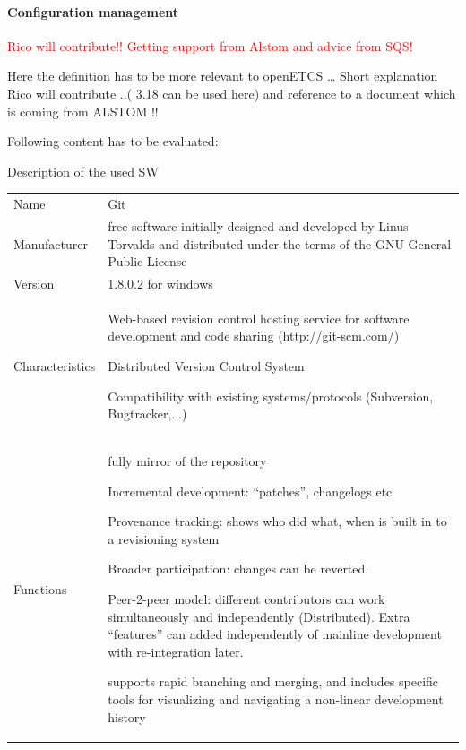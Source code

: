 \documentclass{template/openetcs_article}
\begin{document}
\paragraph{Configuration management}
\textcolor{red}{Rico will contribute!! Getting support from Alstom and advice from SQS!}

Here the definition has to be more relevant to openETCS {\dots}
Short explanation Rico will contribute ..( 3.18 can be used here) and reference to a document which is coming from ALSTOM !!

Following content has to be evaluated:

Description of the used SW 



\begin{flushleft}

\begin{tabular}{|m{3cm}|m{11cm}|}
\hline
\rowcolor{myblue}
\multicolumn{2}{|c|}{CMS Tool} \\\hline
Name &
Git \\\hline
Manufacturer &
free software initially designed and developed by Linus Torvalds and distributed under the terms of the GNU General Public License\\\hline
Version &
1.8.0.2 for windows\\\hline
Characteristics &
Web-based revision control hosting service for software development and code sharing (http://git-scm.com/)

Distributed Version Control System

Compatibility with existing systems/protocols (Subversion, Bugtracker,...)\\\hline
Functions &
fully mirror of the repository

Incremental development: ``patches'', changelogs etc

Provenance tracking: shows who did what, when is built in to a revisioning system

Broader participation: changes can be reverted.

Peer-2-peer model: different contributors can work simultaneously and independently (Distributed). Extra ``features'' can added independently of mainline development with re-integration later. 

supports rapid branching and merging, and includes specific tools for visualizing and navigating a non-linear development history\\\hline
\end{tabular}
\end{flushleft}
\end{document}
